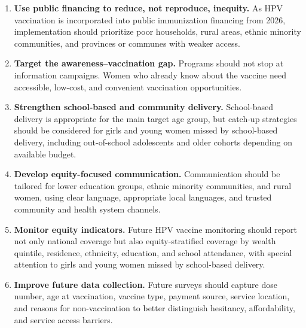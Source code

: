 \begin{enumerate}
    \item \textbf{Use public financing to reduce, not reproduce, inequity.} As HPV vaccination is incorporated into public immunization financing from 2026, implementation should prioritize poor households, rural areas, ethnic minority communities, and provinces or communes with weaker access.
    \item \textbf{Target the awareness--vaccination gap.} Programs should not stop at information campaigns. Women who already know about the vaccine need accessible, low-cost, and convenient vaccination opportunities.
    \item \textbf{Strengthen school-based and community delivery.} School-based delivery is appropriate for the main target age group, but catch-up strategies should be considered for girls and young women missed by school-based delivery, including out-of-school adolescents and older cohorts depending on available budget.
    \item \textbf{Develop equity-focused communication.} Communication should be tailored for lower education groups, ethnic minority communities, and rural women, using clear language, appropriate local languages, and trusted community and health system channels.
    \item \textbf{Monitor equity indicators.} Future HPV vaccine monitoring should report not only national coverage but also equity-stratified coverage by wealth quintile, residence, ethnicity, education, and school attendance, with special attention to girls and young women missed by school-based delivery.
    \item \textbf{Improve future data collection.} Future surveys should capture dose number, age at vaccination, vaccine type, payment source, service location, and reasons for non-vaccination to better distinguish hesitancy, affordability, and service access barriers.
\end{enumerate}

\clearpage

